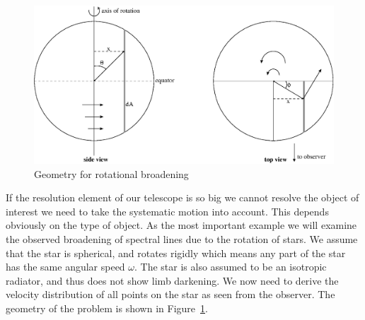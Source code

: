 \documentclass[12pt]{article}
\numberwithin{equation}{section}
\begin{document}
\begin{figure}
  \centering
  \includegraphics[width=12cm]{figs/rotational-broadening}
  \caption{Geometry for rotational broadening
  \label{fig:rot_broad}}
\end{figure}


If the resolution element of our telescope is so big we cannot resolve  the object of interest we need to take the systematic motion into account. This depends obviously on the type of object. As the most important example we will examine the observed broadening of spectral lines due to the rotation of stars. We assume that the star is spherical, and rotates rigidly which means any part of the star has the same angular speed $\omega$. The star is also assumed to be an isotropic radiator, and thus does not show limb darkening. We now need to derive the velocity distribution of all points on the star as seen from the observer. The geometry of the problem is shown in Figure~\ref{fig:rot_broad}.
\end{document}
